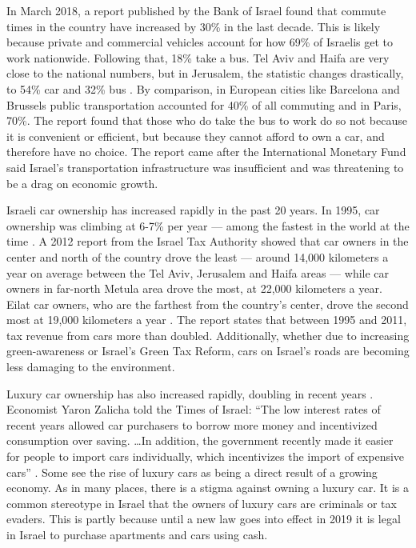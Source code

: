 \documentclass{report}                         %
\begin{document}
In March 2018, a report published by the Bank of Israel found that commute times in the country have increased by 30\% in the last decade. This is likely because private and commercial vehicles account for how 69\% of Israelis get to work nationwide. Following that, 18\% take a bus. Tel Aviv and Haifa are very close to the national numbers, but in Jerusalem, the statistic changes drastically, to 54\% car and 32\% bus \cite{Dori2018IsraeliRoads}. By comparison, in European cities like Barcelona and Brussels public transportation accounted for 40\% of all commuting and in Paris, 70\%. The report found that those who do take the bus to work do so not because it is convenient or efficient, but because they cannot afford to own a car, and therefore have no choice. The report came after the International Monetary Fund said Israel’s transportation infrastructure was insufficient and was threatening to be a drag on economic growth. 

Israeli car ownership has increased rapidly in the past 20 years. In 1995, car ownership was climbing at 6-7\% per year --- among the fastest in the world at the time \cite{Slater1995IsraelCulture}. A 2012 report from the Israel Tax Authority showed that car owners in the center and north of the country drove the least --- around 14,000 kilometers a year on average between the Tel Aviv, Jerusalem and Haifa areas --- while car owners in far-north Metula area drove the most, at 22,000 kilometers a year. Eilat car owners, who are the farthest from the country’s center, drove the second most at 19,000 kilometers a year \cite{Schmil2012WhatHow}. The report states that between 1995 and 2011, tax revenue from cars more than doubled. Additionally, whether due to increasing green-awareness or Israel’s Green Tax Reform, cars on Israel's roads are becoming less damaging to the environment\cite{Schmil2012WhatHow}.

Luxury car ownership has also increased rapidly, doubling in recent years \cite{Weinglass2018Rev-upIsrael}. Economist Yaron Zalicha told the Times of Israel: “The low interest rates of recent years allowed car purchasers to borrow more money and incentivized consumption over saving. …In addition, the government recently made it easier for people to import cars individually, which incentivizes the import of expensive cars” \cite{Weinglass2018Rev-upIsrael}. Some see the rise of luxury cars as being a direct result of a growing economy. As in many places, there is a stigma against owning a luxury car. It is a common stereotype in Israel that the owners of luxury cars are criminals or tax evaders. This is partly because until a new law goes into effect in 2019 it is legal in Israel to purchase apartments and cars using cash.
\end{document}
